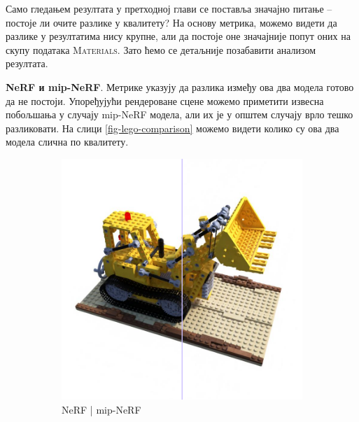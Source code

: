 \documentclass[12pt, a4paper, twoside]{book}
\numberwithin{equation}{chapter}
\numberwithin{theorem}{section}
\numberwithin{definition}{section}
\numberwithin{definitionChapter}{chapter}
\begin{document}
Само гледањем резултата у претходној глави се поставља значајно питање -- постоје ли очите разлике у квалитету?
На основу метрика, можемо видети да разлике у резултатима нису крупне, али да постоје оне значајније попут
оних на скупу података \textsc{Materials}. Зато ћемо се детаљније позабавити анализом резултата.

\textbf{NeRF и mip-NeRF}. Метрике указују да разлика између ова два модела готово да не постоји. Упоређујући рендероване
сцене можемо приметити извесна побољшања у случају mip-NeRF модела, али их је у општем случају врло тешко разликовати.
На слици \ref{fig-lego-comparison} можемо видети колико су ова два модела слична по квалитету.

	\begin{figure}[H]
		\centering
			\begin{subfigure}{0.475\textwidth}
			\centering
			\includegraphics[scale=0.25]{img/comparison/nerf_vs_mipnerf_lego_31.png}
			\caption{NeRF | mip-NeRF}
		\end{subfigure}
		\begin{subfigure}{0.475\textwidth}
			\centering

\end{subfigure}
\end{figure}
\end{document}
